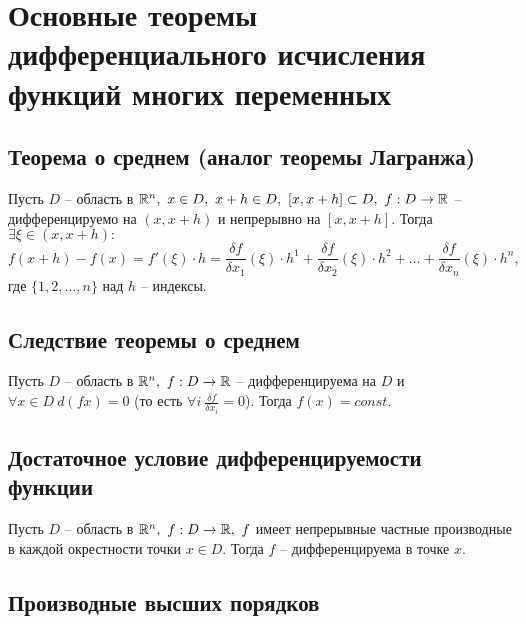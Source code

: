 \section{Основные теоремы дифференциального исчисления функций многих переменных}

\setcounter{subsection}{4}

\subsection{Теорема о среднем (аналог теоремы Лагранжа)}

\begin{theorem}[О среднем]
    Пусть $ D $ -- область в $ \R^n, \ x \in D, \ x + h \in D, \ [x, x+h]\subset D, \ f: D \rightarrow\R $ -- дифференцируемо на $ (x,x+h) $ и непрерывно на $ [x,x+h] $. Тогда $ \exists \xi \in (x,x+h): $
    \[
        f(x+h)-f(x) = f'(\xi)\cdot h = \frac{\delta f}{\delta x_1}(\xi)\cdot h^1 + \frac{\delta f}{\delta x_2}(\xi)\cdot h^2 + \ldots + \frac{\delta f}{\delta x_n}(\xi)\cdot h^n,
    \] где $ \{1,2,\ldots,n\} $ над $ h $ -- индексы.
\end{theorem}

\subsection{Следствие теоремы о среднем}

\begin{corollary}
    Пусть $ D $ -- область в $ \mathbb{R}^n, \ f:D \rightarrow \mathbb{R} $ -- дифференцируема на $ D $ и $ \forall x \in D \ d(fx) = 0 $ (то есть $ \forall i \ \frac{\delta f}{\delta x_i} = 0 $). Тогда $ f(x) = const $.
\end{corollary}

\subsection{Достаточное условие дифференцируемости функции}

\begin{theorem}
    Пусть $ D $ -- область в $ \R^n, \ f:D \rightarrow\R, \ f $ имеет непрерывные частные производные в каждой окрестности точки $ x\in D $. Тогда $ f $ -- дифференцируема в точке $ x $.
\end{theorem}

\subsection{Производные высших порядков}

